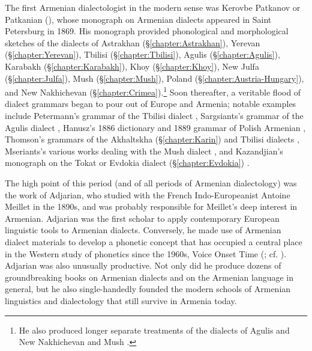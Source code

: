 \documentclass[output=paper]{langscibook}
\begin{document}
The first Armenian dialectologist in the modern sense was  Kerovbe Patkanov or Patkanian (), whose monograph \citep{Patkanian-1869-RussianDialects} on Armenian dialects appeared  in Saint Petersburg in 1869. His monograph provided phonological and morphological sketches of the dialects of Astrakhan (\S\ref{chapter:Astrakhan}), Yerevan (\S\ref{chapter:Yerevan}), Tbilisi (\S\ref{chapter:Tbilisi}), Agulis (\S\ref{chapter:Agulis}), Karabakh (\S\ref{chapter:Karabakh}), Khoy (\S\ref{chapter:Khoy}), New Julfa (\S\ref{chapter:Julfa}), Mush (\S\ref{chapter:Mush}), Poland (\S\ref{chapter:Austria-Hungary}), and New Nakhichevan (\S\ref{chapter:Crimea}).\footnote{He also produced longer separate treatments of the dialects of Agulis \citep{Patkanoff-1866-Agulis} and New Nakhichevan and Mush \citep{Patkanian-1875-RussianDialects}.} Soon thereafter, a veritable flood of dialect grammars began to pour out of Europe and Armenia; notable examples include Petermann's  grammar of the Tbilisi dialect \citep{Petermann-1867-Tiflis}, Sargsiants's   grammar of the Agulis dialect \citep{Sargiants-1883-Agulis},   Hanusz's  1886 dictionary and 1889 grammar of Polish Armenian \citep{Hanusz-1886-PolishArmenian,Hanusz-1889-PhonoPolishArmenian}, Thomson's grammars of the Akhaltskha  (\S\ref{chapter:Karin}) and Tbilisi  dialects \citep{Thomson-1887-Karin,Thomson-1890-Tiflis}, Mseriants's various works dealing with the Mush dialect \citep{Mseriants-1897-Part1}, and Kazandjian's monograph on the Tokat or Evdokia dialect  (\S\ref{chapter:Evdokia}) \citep{KazandjianBook}. 



The high point of this period (and of all periods of Armenian dialectology) was the work of Adjarian, who studied with the French Indo-Europeanist Antoine Meillet in the 1890s, and was probably responsible for Meillet's deep interest in Armenian. Adjarian was the first scholar to apply contemporary European linguistic tools to  Armenian dialects. Conversely, he made use of Armenian dialect materials to develop a phonetic concept that has occupied a central place in the Western study of phonetics since the 1960s, Voice Onset Time (\citealt{braun-2013-earlyCaseVOTAdjarian}; cf. \citealt{liskerAbramson-1964-crossLangugeStudyVoicingIniitalStop}). Adjarian was also unusually productive. Not only did he produce dozens of groundbreaking books on Armenian dialects and on the Armenian language in general, but he also single-handedly founded the modern schools of Armenian linguistics and dialectology that still survive in Armenia today.
\end{document}
